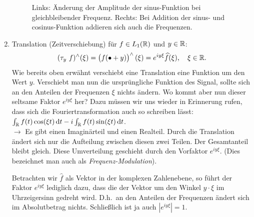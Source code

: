 \begin{remark}
\begin{enumerate}
\begin{figure}[ht]
\begin{minipage}{0.49\linewidth}
      \end{minipage}
      \caption{Links: Änderung der Amplitude der sinus-Funktion bei gleichbleibender Frequenz.
        Rechts: Bei Addition der sinus- und cosinus-Funktion addieren sich auch die Frequenzen.}
      \label{fig:FT_Linear}
    \end{figure}
		\item Translation (Zeitverschiebung) für $ f \in L_1(\mathbb{R}) $ und $ y \in \mathbb{R} $:
		\[ 
    		(\tau_{y} \ f)^{\wedge}(\xi) 
  		= \left( f(\bullet + y) \right)^{\wedge}(\xi) 
  		= e^{iy\xi}\widehat{f}(\xi), \quad \xi \in \mathbb{R}.
    \]
		Wie bereits oben erwähnt verschiebt eine Translation eine Funktion um den Wert $ y $. 
		Verschiebt man nun die ursprüngliche Funktion des Signal, sollte sich an den Anteilen der 
		Frequenzen $ \xi $ nichts ändern. Wo kommt aber nun dieser seltsame Faktor $ e^{iy\xi} $ her? 
		Dazu müssen wir uns wieder in Erinnerung rufen, dass sich die Fouriertransformation auch so 
		schreiben lässt: $ \int_{\R} f(t) \cos(\xi t) \dif t - i \int_{\R} f(t) \sin(\xi t) \dif t $.\\
		$ \rightarrow $ Es gibt einen Imaginärteil und einen Realteil. Durch die Translation ändert 
		sich nur die Aufteilung zwischen diesen zwei Teilen. Der Gesamtanteil bleibt gleich. Diese 
		Umverteilung geschieht durch den Vorfaktor $ e^{iy\xi} $. (Dies bezeichnet man auch als
		\emph{Frequenz-Modulation}).
		
		Betrachten wir $ \widehat{f} $ als Vektor in der komplexen Zahlenebene, so führt der Faktor $ 
		e^{iy\xi} $ lediglich dazu, dass die 
		der Vektor um den Winkel $ y \cdot \xi $ im Uhrzeigersinn gedreht wird. D.h.\ an den Anteilen
		der Frequenzen ändert sich im Absolutbetrag nichts. Schließlich ist ja auch $ |e^{iy\xi}| = 1 $.
		

\end{enumerate}
\end{remark}
